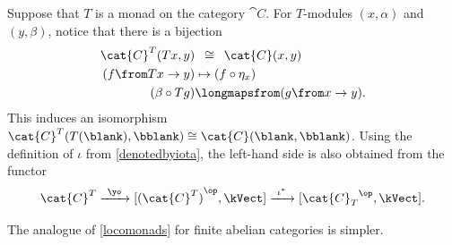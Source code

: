 \begin{remark}\label{rmk:em-iso-and-so-on}
  Suppose that \(T\) is a monad on the category \(\cat{C}\).
  For \(T\)\hyp{}modules \((x, \alpha)\) and \((y, \beta)\),
  notice that there is a bijection
  \begin{equation}\label{eq:fincorestr:iso}
    \begin{aligned}
      \cat{C}^T(Tx, y) &\,\ \cong\,\ \cat{C}(x, y) \\
      (f\from Tx \to y) &\mapsto (f \circ \eta_x) \\
      (\beta \circ Tg) &\longmapsfrom (g\from x \to y).
    \end{aligned}
  \end{equation}
  This induces an isomorphism \(\cat{C}^T(T(\blank), \bblank) \cong \cat{C}(\blank, \bblank)\).
  Using the definition of \(\iota\) from \cref{denotedbyiota},
  the left-hand side is also obtained from the functor
  \[
    \cat{C}^T
    \xrightarrow{\ \yo\ } [{(\cat{C}^T)}^{\op}, \kVect]
    \xrightarrow{\ \iota^{\ast}\ } [{\cat{C}_T}^{\op}, \kVect].
  \]
\end{remark}

The analogue of \cref{locomonads} for finite abelian categories is simpler.

